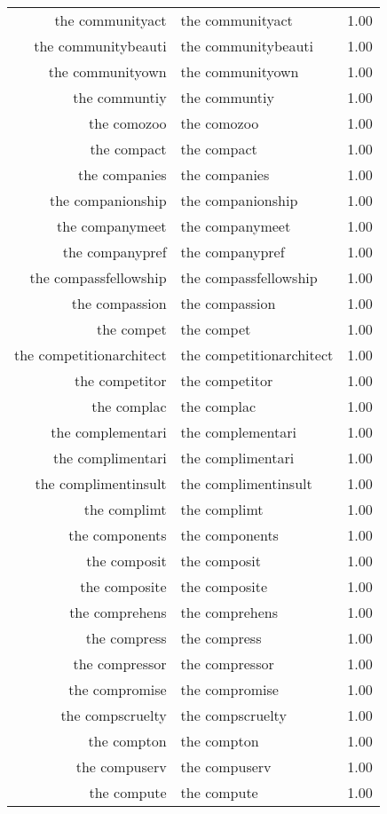 \begin{table}[ht]
\begin{tabular}{rlr}
  the communityact & the communityact & 1.00 \\ 
  the communitybeauti & the communitybeauti & 1.00 \\ 
  the communityown & the communityown & 1.00 \\ 
  the communtiy & the communtiy & 1.00 \\ 
  the comozoo & the comozoo & 1.00 \\ 
  the compact & the compact & 1.00 \\ 
  the companies & the companies & 1.00 \\ 
  the companionship & the companionship & 1.00 \\ 
  the companymeet & the companymeet & 1.00 \\ 
  the companypref & the companypref & 1.00 \\ 
  the compassfellowship & the compassfellowship & 1.00 \\ 
  the compassion & the compassion & 1.00 \\ 
  the compet & the compet & 1.00 \\ 
  the competitionarchitect & the competitionarchitect & 1.00 \\ 
  the competitor & the competitor & 1.00 \\ 
  the complac & the complac & 1.00 \\ 
  the complementari & the complementari & 1.00 \\ 
  the complimentari & the complimentari & 1.00 \\ 
  the complimentinsult & the complimentinsult & 1.00 \\ 
  the complimt & the complimt & 1.00 \\ 
  the components & the components & 1.00 \\ 
  the composit & the composit & 1.00 \\ 
  the composite & the composite & 1.00 \\ 
  the comprehens & the comprehens & 1.00 \\ 
  the compress & the compress & 1.00 \\ 
  the compressor & the compressor & 1.00 \\ 
  the compromise & the compromise & 1.00 \\ 
  the compscruelty & the compscruelty & 1.00 \\ 
  the compton & the compton & 1.00 \\ 
  the compuserv & the compuserv & 1.00 \\ 
  the compute & the compute & 1.00 \\ 

\end{tabular}
\end{table}
